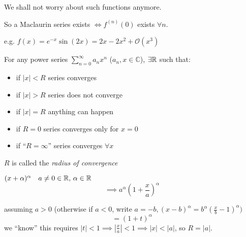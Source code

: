 \documentclass[twoside]{scrartcl}
\begin{document}
 We shall not worry about such functions anymore.
 
So a Maclaurin series exists $\iff f^{(n)}(0)$ exists $\forall n$. 

e.g. $f(x) = e^{-x}\sin(2x) = 2x - 2x^2 + \mathcal{O}(x^3)$

\vspace*{5pt}

\begin{definition}
For any power series $\displaystyle{\sum_{n=0}^{\infty} a_nx^n}$ ($a_n, x \in \mathbb{C}$), $\exists \mathbb{R}$ such that:

\begin{itemize}
\item if $|x| < R$ series converges
\item if $|x| > R$ series does not converge
\item if $|x| = R$ anything can happen
\item if $R = 0$ series converges only for $x = 0$
\item if ``$R = \infty$'' series converges $\forall x$
\end{itemize}

$R$ is called the \emph{radius of convergence}
\end{definition}\vspace*{-5pt}


\begin{center}
\end{center}


\begin{example}$(x+\alpha)^{\alpha} \quad a \neq 0 \in \mathbb{R},\, \alpha \in \mathbb{R}$
\[\implies a^{\alpha}(1 + \frac{x}{a})^{\alpha}\]

assuming $a >0$ (otherwise if $a <0$, write $a=-b, (x-b)^{\alpha} = b^{\alpha}(\frac{x}{b} -1)^{\alpha})$
\[= (1+t)^{\alpha}\]
 we ``know'' this requires $|t|<1 \implies |\frac{x}{a}| < 1 \implies |x| < |a|$, so $\boxed{R = |a|}$.
\end{example}\vspace*{5pt}
\end{document}
